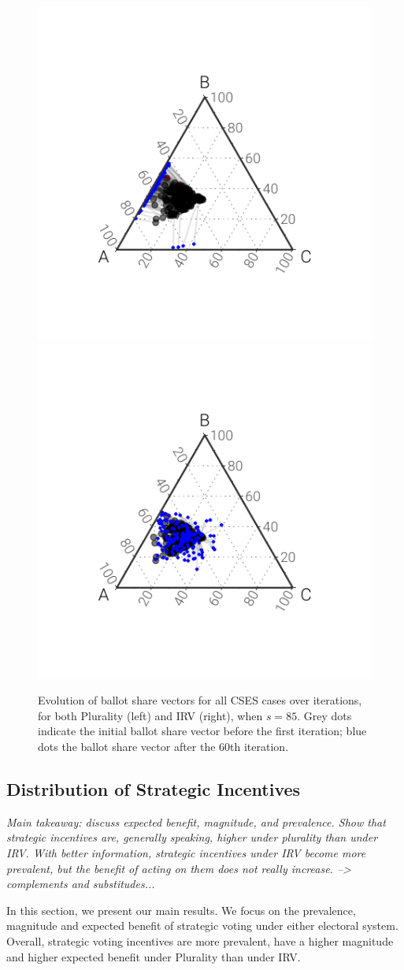 \documentclass[12pt, letter]{article}
\begin{document}
\begin{figure}[]
	\centering
	\includegraphics[width = .49\textwidth]{../output/figures/tatonnement_plur}
	\includegraphics[width = .49\textwidth]{../output/figures/tatonnement_rcv}
	\caption{Evolution of ballot share vectors for all CSES cases over iterations, for both Plurality (left) and IRV (right), when $s = 85$. Grey dots indicate the initial ballot share vector before the first iteration; blue dots the ballot share vector after the 60th iteration.}
	\label{fig:convergence_paths}
\end{figure}

\subsection{Distribution of Strategic Incentives}

\textit{Main takeaway: discuss expected benefit, magnitude, and prevalence. Show that strategic incentives are, generally speaking, higher under plurality than under IRV. With better information, strategic incentives under IRV become more prevalent, but the benefit of acting on them does not really increase. --> complements and substitudes...}

In this section, we present our main results. We focus on the prevalence, magnitude and expected benefit of strategic voting under either electoral system. Overall, strategic voting incentives are more prevalent, have a higher magnitude and higher expected benefit under Plurality than under IRV.
\end{document}
